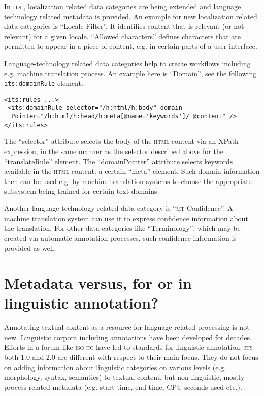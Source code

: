 \documentclass[output=paper]{LSP/langsci}
\begin{document}
In \textsc{its }, localization related data categories are being extended and language technology related metadata is provided.  An example for new localization related data categories is ``Locale Filter''. It identifies content that is relevant (or not relevant) for a given locale. ``Allowed characters'' defines characters that are permitted to appear in a piece of content, e.g. in certain parts of a user interface.

Language-technology related data categories help to create workflows including e.g. machine translation process. An example here is ``Domain'', see the following \texttt{its:domainRule} element. 

\begin{lstlisting}
<its:rules ...>
 <its:domainRule selector="/h:html/h:body" domain 
  Pointer="/h:html/h:head/h:meta[@name='keywords']/ @content" />
</its:rules>
\end{lstlisting}

The ``selector'' attribute selects the body of the \textsc{html} content via an XPath expression, in the same manner as the selector described above for the ``translateRule'' element. The ``domainPointer'' attribute selects keywords available in the \textsc{html} content: a certain ``meta'' element. Such domain information then can be used e.g. by machine translation systems to choose the appropriate subsystem being trained for certain text domains.

Another language-technology related data category is ``\textsc{mt} Confidence''. A machine translation system can use it to express confidence information about the translation. For other data categories like ``Terminology'', which may be created via automatic annotation processes, such confidence information is provided as well.

\section{Metadata versus, for or in linguistic annotation?}\label{sec:sasaki:4}

Annotating textual content as a resource for language related processing is not new. Linguistic corpora including annotations have been developed for decades. Efforts in a forum like \textsc{iso tc } have led to standards for linguistic annotation. \textsc{its} both 1.0 and 2.0 are different with respect to their main focus. They do not focus on adding information about linguistic categories on various levels (e.g. morphology, syntax, semantics) to textual content, but non-linguistic, mostly process related metadata (e.g. start time, end time, CPU seconds used etc.). 
\end{document}
